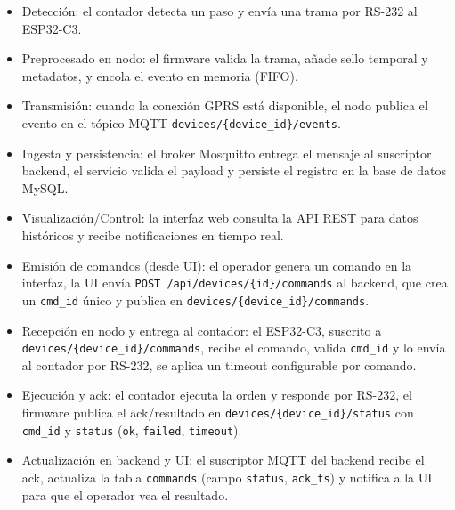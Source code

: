 \begin{itemize}

  \item Detección: el contador detecta un paso y envía una trama por RS-232 al ESP32-C3.

  \item Preprocesado en nodo: el firmware valida la trama, añade sello temporal y metadatos, y encola el evento en memoria (FIFO).

  \item Transmisión: cuando la conexión GPRS está disponible, el nodo publica el evento en el tópico MQTT \texttt{devices/\{device\_id\}/events}.
  
  \item Ingesta y persistencia: el broker Mosquitto entrega el mensaje al suscriptor backend, el servicio valida el payload y persiste el registro en la base de datos MySQL.
  
  \item Visualización/Control: la interfaz web consulta la API REST para datos históricos y recibe notificaciones en tiempo real.
  
  \item Emisión de comandos (desde UI): el operador genera un comando en la interfaz, la UI envía
  \texttt{POST /api/devices/\{id\}/commands} al backend, que crea un \texttt{cmd\_id} único y publica en \texttt{devices/\{device\_id\}/commands}.
  
  \item Recepción en nodo y entrega al contador: el ESP32-C3, suscrito a \texttt{devices/\{device\_id\}/commands}, recibe el comando, valida \texttt{cmd\_id} y lo envía al contador por RS-232, se aplica un timeout configurable por comando.
  
  \item Ejecución y ack: el contador ejecuta la orden y responde por RS-232, el firmware publica el ack/resultado en \texttt{devices/\{device\_id\}/status} con \texttt{cmd\_id} y \texttt{status} (\texttt{ok}, \texttt{failed}, \texttt{timeout}).

  \item Actualización en backend y UI: el suscriptor MQTT del backend recibe el ack, actualiza la tabla \texttt{commands} (campo \texttt{status}, \texttt{ack\_ts}) y notifica a la UI para que el operador vea el resultado.
\end{itemize}


